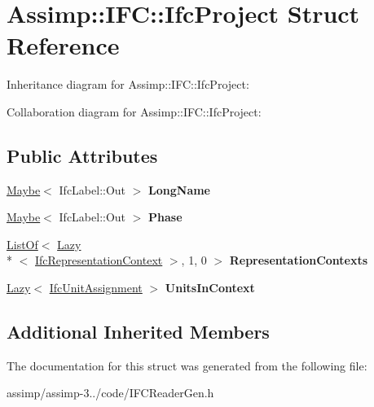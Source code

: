 \hypertarget{struct_assimp_1_1_i_f_c_1_1_ifc_project}{\section{Assimp\+:\+:I\+F\+C\+:\+:Ifc\+Project Struct Reference}
\label{struct_assimp_1_1_i_f_c_1_1_ifc_project}
}


Inheritance diagram for Assimp\+:\+:I\+F\+C\+:\+:Ifc\+Project\+:


Collaboration diagram for Assimp\+:\+:I\+F\+C\+:\+:Ifc\+Project\+:
\subsection*{Public Attributes}
\begin{DoxyCompactItemize}
\item 
\hypertarget{struct_assimp_1_1_i_f_c_1_1_ifc_project_a2a11ddf57aac55485cb0c99b083786fc}{\hyperlink{struct_assimp_1_1_s_t_e_p_1_1_maybe}{Maybe}$<$ Ifc\+Label\+::\+Out $>$ {\bfseries Long\+Name}}\label{struct_assimp_1_1_i_f_c_1_1_ifc_project_a2a11ddf57aac55485cb0c99b083786fc}

\item 
\hypertarget{struct_assimp_1_1_i_f_c_1_1_ifc_project_a13b644ba7f43d596056ad71d11b6cbbc}{\hyperlink{struct_assimp_1_1_s_t_e_p_1_1_maybe}{Maybe}$<$ Ifc\+Label\+::\+Out $>$ {\bfseries Phase}}\label{struct_assimp_1_1_i_f_c_1_1_ifc_project_a13b644ba7f43d596056ad71d11b6cbbc}

\item 
\hypertarget{struct_assimp_1_1_i_f_c_1_1_ifc_project_a16517427499c4500077944f9cfbb0210}{\hyperlink{struct_assimp_1_1_s_t_e_p_1_1_list_of}{List\+Of}$<$ \hyperlink{struct_assimp_1_1_s_t_e_p_1_1_lazy}{Lazy}\\*
$<$ \hyperlink{struct_assimp_1_1_i_f_c_1_1_ifc_representation_context}{Ifc\+Representation\+Context} $>$, 1, 0 $>$ {\bfseries Representation\+Contexts}}\label{struct_assimp_1_1_i_f_c_1_1_ifc_project_a16517427499c4500077944f9cfbb0210}

\item 
\hypertarget{struct_assimp_1_1_i_f_c_1_1_ifc_project_a2b3dc37c7fee514019bf446e224a2660}{\hyperlink{struct_assimp_1_1_s_t_e_p_1_1_lazy}{Lazy}$<$ \hyperlink{struct_assimp_1_1_i_f_c_1_1_ifc_unit_assignment}{Ifc\+Unit\+Assignment} $>$ {\bfseries Units\+In\+Context}}\label{struct_assimp_1_1_i_f_c_1_1_ifc_project_a2b3dc37c7fee514019bf446e224a2660}

\end{DoxyCompactItemize}
\subsection*{Additional Inherited Members}


The documentation for this struct was generated from the following file\+:\begin{DoxyCompactItemize}
\item 
assimp/assimp-\/3../code/I\+F\+C\+Reader\+Gen.\+h\end{DoxyCompactItemize}

